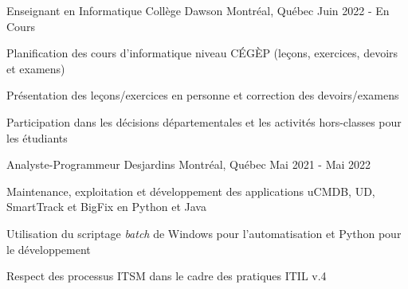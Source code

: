

\begin{cventries}

  
  \cventry
    {Enseignant en Informatique} %
    {Collège Dawson} %
    {Montréal, Québec} %
    {Juin 2022 - En Cours} %
    {
      \begin{cvitems} %
        \item {Planification des cours d'informatique niveau CÉGÈP (leçons, exercices, devoirs et examens)}
        \item {Présentation des leçons/exercices en personne et correction des devoirs/examens}
        \item {Participation dans les décisions départementales et les activités hors-classes pour les étudiants}
      \end{cvitems}
    }
 
  \cventry
    {Analyste-Programmeur} %
    {Desjardins} %
    {Montréal, Québec} %
    {Mai 2021 - Mai 2022} %
    {
      \begin{cvitems} %
        \item {Maintenance, exploitation et développement des applications uCMDB, UD, SmartTrack et BigFix en Python et Java}
        \item {Utilisation du scriptage \textit{batch} de Windows pour l'automatisation et Python pour le développement}
        \item {Respect des processus ITSM dans le cadre des pratiques ITIL v.4}
      \end{cvitems}
    }
    


\end{cventries}
